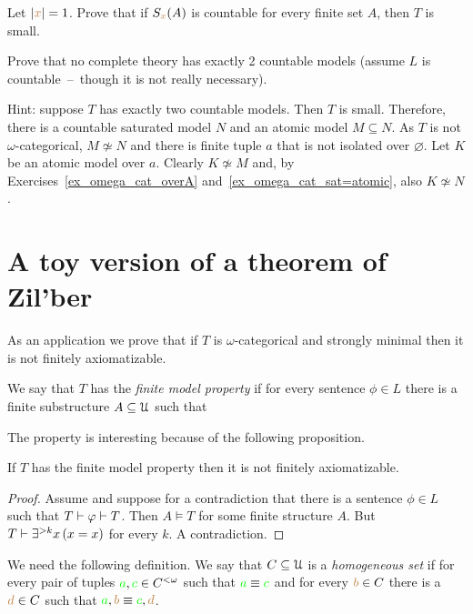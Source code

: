 
\begin{exercise}
Let $|{\color{brown} x}|=1$.
Prove that if $S_{{\color{brown} x}}(A)$ is countable for every finite set $A$, then $T$ is small.
\end{exercise}


\begin{exercise}[ (Vaught)]
Prove that no complete theory has exactly 2 countable models (assume $L$ is countable~--~though it is not really necessary).

Hint: suppose $T$ has exactly two countable models.
Then $T$ is small. 
Therefore, there is a countable saturated model $N$ and an atomic model $M\subseteq N$.
As $T$ is not $\omega$-categorical, $M\not\simeq N$ and there is finite tuple $a$ that is not isolated over $\varnothing$.
Let $K$ be an atomic model over $a$.
Clearly $K\not\simeq M$ and, by Exercises~\ref{ex_omega_cat_overA} and~\ref{ex_omega_cat_sat=atomic}, also $K\not\simeq N$.
\end{exercise}

\section{A toy version of a theorem of Zil'ber}\label{toy}

As an application we prove that if $T$ is $\omega$-categorical and strongly minimal then it is not finitely axiomatizable.

We say that $T$ has the \emph{finite model property\/} if for every sentence $\phi\in L$ there is a finite substructure $A\subseteq\EuScript U$ such that 


The property is interesting because of the following proposition.

\begin{proposition}\label{prop_fmp_fa}
If $T$ has the finite model property then it is not finitely axiomatizable.
\end{proposition}
\begin{proof}
Assume  and suppose for a contradiction that there is a sentence $\phi\in L$ such that $T\vdash\varphi\vdash T$.
Then $A\models T$ for some finite structure $A$.
But $T\vdash \exists^{>k}x\,(x=x)$ for every $k$.
A contradiction.
\end{proof}
We need the following definition.
We say that $C\subseteq\EuScript U$ is a \emph{homogeneous set\/} if for every pair of tuples  ${\color{green} a},{\color{green} c}\in C^{<\omega}$ such that ${\color{green} a}\equiv{\color{green}c}$ and for every ${\color{brown} b}\in C$ there is a ${\color{brown} d}\in C$ such that ${\color{green} a},{\color{brown} b}\equiv {\color{green}c},{\color{brown} d}$.

